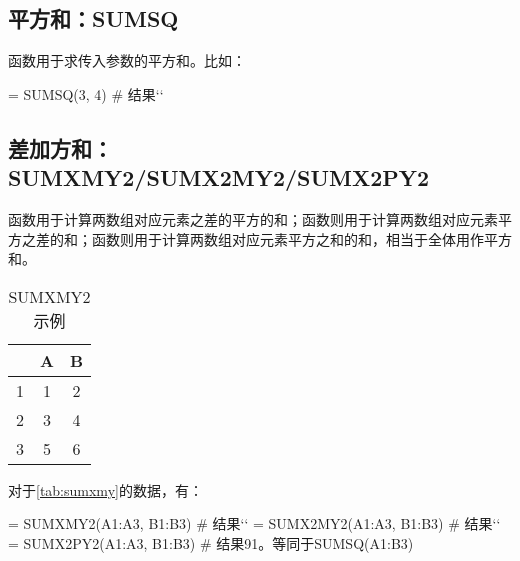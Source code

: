 \subsection{平方和：SUMSQ}
函数用于求传入参数的平方和。比如：
\begin{excode}
= SUMSQ(3, 4)  # 结果``
\end{excode}

\subsection{差加方和：SUMXMY2/SUMX2MY2/SUMX2PY2}
函数用于计算两数组对应元素之差的平方的和；函数则用于计算两数组对应元素平方之差的和；函数则用于计算两数组对应元素平方之和的和，相当于全体用作平方和。

\begin{table}[!hbt]
    \centering
    \caption{SUMXMY2示例}\label{tab:sumxmy}
    \begin{tabular}{c|cc}
    \hline
      & A & B \\
    \hline
    1 & 1 & 2 \\
    2 & 3 & 4 \\
    3 & 5 & 6 \\
    \hline
    \end{tabular}
\end{table}

对于\autoref{tab:sumxmy}的数据，有：
\begin{excode}
= SUMXMY2(A1:A3, B1:B3)  # 结果``
= SUMX2MY2(A1:A3, B1:B3)  # 结果``
= SUMX2PY2(A1:A3, B1:B3)  # 结果91。等同于SUMSQ(A1:B3)
\end{excode}

